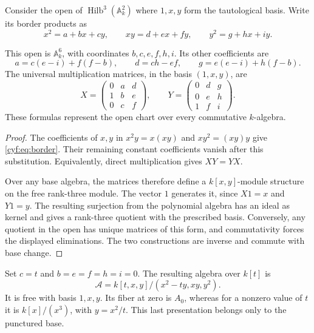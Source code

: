 Consider the open of \(\operatorname{Hilb}^3(\mathbb A_k^2)\)
where \(1,x,y\) form the tautological basis. Write its
border products as
\[
 x^2=a+bx+cy,\qquad xy=d+ex+fy,\qquad y^2=g+hx+iy.
\]

\begin{theorem}\label{cyf:thm:chart}
This open is \(\mathbb A_k^6\), with coordinates
\(b,c,e,f,h,i\). Its other coefficients are
\begin{equation}\label{cyf:eq:border}
 a=c(e-i)+f(f-b),\qquad d=ch-ef,\qquad
                      g=e(e-i)+h(f-b).
\end{equation}
The universal multiplication matrices, in the basis
\((1,x,y)\), are
\[
 X=\begin{pmatrix}0&a&d\\1&b&e\\0&c&f\end{pmatrix},
 \qquad
 Y=\begin{pmatrix}0&d&g\\0&e&h\\1&f&i\end{pmatrix}.
\]
These formulas represent the open chart over every
commutative \(k\)-algebra.
\end{theorem}

\begin{proof}
The coefficients of \(x,y\) in
\(x^2y=x(xy)\) and \(xy^2=(xy)y\) give
\eqref{cyf:eq:border}. Their remaining constant
coefficients vanish after this substitution. Equivalently,
direct multiplication gives \(XY=YX\).

Over any base algebra, the matrices therefore define a
\(k[x,y]\)-module structure on the free rank-three module.
The vector \(1\) generates it, since \(X1=x\) and
\(Y1=y\). The resulting surjection from the polynomial
algebra has an ideal as kernel and gives a rank-three
quotient with the prescribed basis. Conversely, any quotient
in the open has unique matrices of this form, and
commutativity forces the displayed eliminations. The two
constructions are inverse and commute with base change.
\end{proof}

Set \(c=t\) and \(b=e=f=h=i=0\). The resulting algebra
over \(k[t]\) is
\begin{equation}\label{cyf:eq:family}
 \mathcal A=k[t,x,y]/(x^2-ty,xy,y^2).
\end{equation}
It is free with basis \(1,x,y\). Its fiber at zero is
\(A_0\), whereas for a nonzero value of \(t\) it is
\(k[x]/(x^3)\), with \(y=x^2/t\).
This last presentation belongs only to the punctured base.

